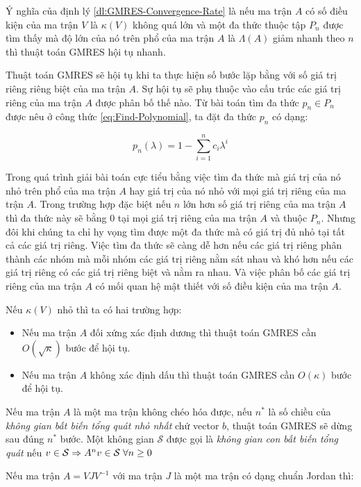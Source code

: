 \documentclass[14pt, a4paper]{article}
\numberwithin{equation}{section}
\numberwithin{algorithm}{section}
\numberwithin{figure}{section}
\numberwithin{dl}{section}
\numberwithin{md}{section}
\numberwithin{bd}{section}
\numberwithin{dn}{section}
\begin{document}
Ý nghĩa của định lý \ref{dl:GMRES-Convergence-Rate} là nếu ma trận $A$ có số điều kiện của ma trận $V$ là $\kappa(V)$ không quá lớn và một đa thức thuộc tập $P_n$ được tìm thấy mà độ lớn của nó trên phổ của ma trận $A$ là $\Lambda(A)$ giảm nhanh theo $n$ thì thuật toán GMRES hội tụ nhanh.

Thuật toán GMRES sẽ hội tụ khi ta thực hiện số bước lặp bằng với số giá trị riêng riêng biệt của ma trận $A$. Sự hội tụ sẽ phụ thuộc vào cấu trúc các giá trị riêng của ma trận $A$ được phân bố thế nào.
Từ bài toán tìm đa thức $p_n \in P_n$ được nêu ở công thức \ref{eq:Find-Polynomial}, ta đặt đa thức $p_n$ có dạng:

\begin{equation}
    p_n(\lambda) = 1 - \sum_{i=1}^n c_i \lambda^i
\end{equation}

Trong quá trình giải bài toán cực tiểu bằng việc tìm đa thức mà giá trị của nó nhỏ trên phổ của ma trận $A$ hay giá trị của nó nhỏ với mọi giá trị riêng của ma trận $A$. Trong trường hợp đặc biệt nếu $n$ lớn hơn số giá trị riêng của ma trận $A$ thì đa thức này sẽ bằng 0 tại mọi giá trị riêng của ma trận $A$ và thuộc $P_n$.
Nhưng đôi khi chúng ta chỉ hy vọng tìm được một đa thức mà có giá trị đủ nhỏ tại tất cả các giá trị riêng. Việc tìm đa thức sẽ càng dễ hơn nếu các giá trị riêng phân thành các nhóm mà mỗi nhóm các giá trị riêng nằm sát nhau và khó hơn nếu các giá trị riêng có các giá trị riêng biệt và nằm ra nhau. Và việc phân bố các giá trị riêng của ma trận $A$ có mối quan hệ mật thiết với số điều kiện của ma trận $A$.

Nếu $\kappa(V)$ nhỏ thì ta có hai trường hợp:
\begin{itemize}
    \item Nếu ma trận $A$ đối xứng xác định dương thì thuật toán GMRES cần $O(\sqrt{\kappa})$ bước để hội tụ.
    \item Nếu ma trận $A$ không xác định dấu thì thuật toán GMRES cần $O(\kappa)$ bước để hội tụ.
\end{itemize}

Nếu ma trận $A$ là một ma trận không chéo hóa được, nếu $n^{*}$ là số chiều của \textit{không gian bất biến tổng quát nhỏ nhất} chứ vector $b$, thuật toán GMRES sẽ dừng sau đúng $n^{*}$ bước. Một không gian $\mathcal{S}$ được gọi là \textit{không gian con bất biến tổng quát} nếu $v \in \mathcal{S} \Rightarrow A^{n}v \in \mathcal{S} \thickspace \forall n \geq 0$ 

Nếu ma trận $A=VJV^{-1}$ với ma trận $J$ là một ma trận có dạng chuẩn Jordan thì:
\end{document}

